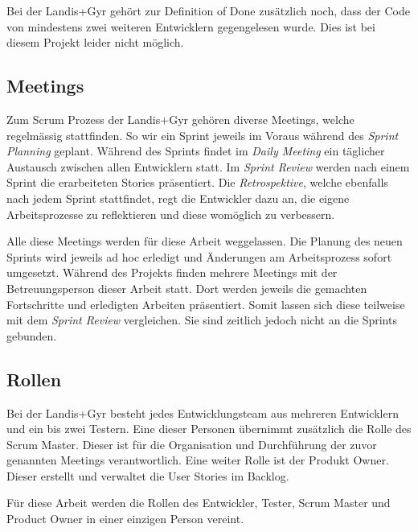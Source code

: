 Bei der Landis+Gyr gehört zur Definition of Done zusätzlich noch, dass der Code von mindestens zwei weiteren Entwicklern gegengelesen wurde.
Dies ist bei diesem Projekt leider nicht möglich.


\subsection{Meetings}
Zum Scrum Prozess der Landis+Gyr gehören diverse Meetings, welche regelmässig stattfinden.
So wir ein Sprint jeweils im Voraus während des \textit{Sprint Planning} geplant.
Während des Sprints findet im \textit{Daily Meeting} ein täglicher Austausch zwischen allen Entwicklern statt.
Im \textit{Sprint Review} werden nach einem Sprint die erarbeiteten Stories präsentiert.
Die \textit{Retrospektive}, welche ebenfalls nach jedem Sprint stattfindet, regt die Entwickler dazu an, die eigene Arbeitsprozesse zu reflektieren und diese womöglich zu verbessern.

Alle diese Meetings werden für diese Arbeit weggelassen.
Die Planung des neuen Sprints wird jeweils ad hoc erledigt und Änderungen am Arbeitsprozess sofort umgesetzt.
Während des Projekts finden mehrere Meetings mit der Betreuungsperson dieser Arbeit statt.
Dort werden jeweils die gemachten Fortschritte und erledigten Arbeiten präsentiert.
Somit lassen sich diese teilweise mit dem \textit{Sprint Review} vergleichen.
Sie sind zeitlich jedoch nicht an die Sprints gebunden.

\subsection{Rollen}
Bei der Landis+Gyr besteht jedes Entwicklungsteam aus mehreren Entwicklern und ein bis zwei Testern.
Eine dieser Personen übernimmt zusätzlich die Rolle des Scrum Master.
Dieser ist für die Organisation und Durchführung der zuvor genannten Meetings verantwortlich.
Eine weiter Rolle ist der Produkt Owner.
Dieser erstellt und verwaltet die User Stories im Backlog.

Für diese Arbeit werden die Rollen des Entwickler, Tester, Scrum Master und Product Owner in einer einzigen Person vereint.


